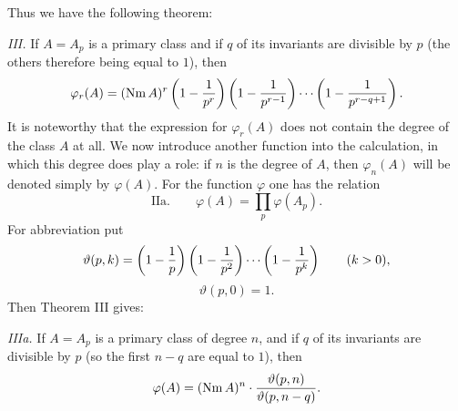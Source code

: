 \documentclass[11pt,a4paper]{article}
\newcommand{\Nm}{\operatorname{Nm}}
\newcommand{\tht}{\vartheta}
\begin{document}
Thus we have the following theorem:

\emph{III.} If $A=A_p$ is a primary class and if $q$ of its invariants are divisible by $p$ (the others therefore being equal to $1$), then
\[
 \varphi_r(A)=(\Nm A)^r
 \left(1-{1\over p^r}\right)
 \left(1-{1\over p^{r-1}}\right)
 \cdots
 \left(1-{1\over p^{r-q+1}}\right).
\]
It is noteworthy that the expression for $\varphi_r(A)$ does not contain the degree of the class $A$ at all. We now introduce another function into the calculation, in which this degree does play a role: if $n$ is the degree of $A$, then $\varphi_n(A)$ will be denoted simply by $\varphi(A)$. For the function $\varphi$ one has the relation
\[
\text{IIa.}\qquad
 \varphi(A)=\prod_p \varphi(A_p).
\]
For abbreviation put
\[
 \tht(p,k)=\left(1-{1\over p}\right)
 \left(1-{1\over p^2}\right)\cdots
 \left(1-{1\over p^k}\right)\qquad (k>0),
\]
\[
 \tht(p,0)=1.
\]
Then Theorem III gives:

\emph{IIIa.} If $A=A_p$ is a primary class of degree $n$, and if $q$ of its invariants are divisible by $p$ (so the first $n-q$ are equal to $1$), then
\[
 \varphi(A)=(\Nm A)^n\cdot {\tht(p,n)\over \tht(p,n-q)}.
\]
\end{document}

